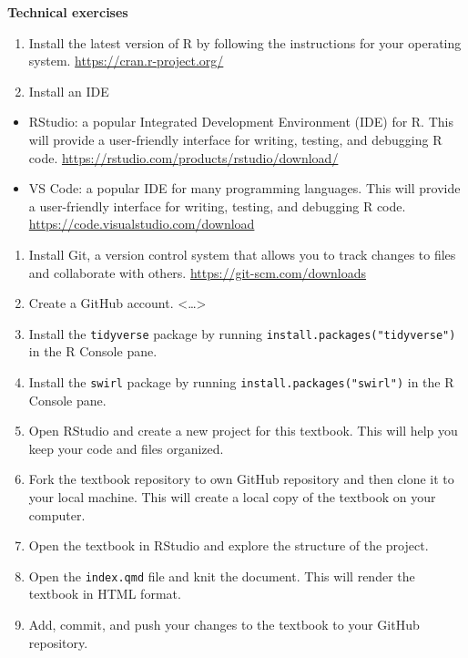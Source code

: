 \documentclass[
  letterpaper,
]{latex/krantz}
\providecommand{\tightlist}{%
  \setlength{\itemsep}{0pt}\setlength{\parskip}{0pt}}\usepackage{longtable,booktabs,array}
\begin{document}
\begin{tcolorbox}[enhanced jigsaw, left=2mm, arc=.35mm, colback=white, rightrule=.15mm, toprule=.15mm, breakable, leftrule=.75mm, opacityback=0, bottomrule=.15mm]

\textbf{Technical exercises}

\begin{enumerate}
\def\labelenumi{\arabic{enumi}.}
\tightlist
\item
  Install the latest version of R by following the instructions for your
  operating system. \url{https://cran.r-project.org/}
\item
  Install an IDE
\end{enumerate}

\begin{itemize}
\tightlist
\item
  RStudio: a popular Integrated Development Environment (IDE) for R.
  This will provide a user-friendly interface for writing, testing, and
  debugging R code. \url{https://rstudio.com/products/rstudio/download/}
\item
  VS Code: a popular IDE for many programming languages. This will
  provide a user-friendly interface for writing, testing, and debugging
  R code. \url{https://code.visualstudio.com/download}
\end{itemize}

\begin{enumerate}
\def\labelenumi{\arabic{enumi}.}
\setcounter{enumi}{2}
\tightlist
\item
  Install Git, a version control system that allows you to track changes
  to files and collaborate with others.
  \url{https://git-scm.com/downloads}
\item
  Create a GitHub account. \textless\ldots\textgreater{}
\item
  Install the \texttt{tidyverse} package by running
  \texttt{install.packages("tidyverse")} in the R Console pane.
\item
  Install the \texttt{swirl} package by running
  \texttt{install.packages("swirl")} in the R Console pane.
\item
  Open RStudio and create a new project for this textbook. This will
  help you keep your code and files organized.
\item
  Fork the textbook repository to own GitHub repository and then clone
  it to your local machine. This will create a local copy of the
  textbook on your computer.
\item
  Open the textbook in RStudio and explore the structure of the project.
\item
  Open the \texttt{index.qmd} file and knit the document. This will
  render the textbook in HTML format.
\item
  Add, commit, and push your changes to the textbook to your GitHub
  repository.
\end{enumerate}

\end{tcolorbox}
\end{document}
